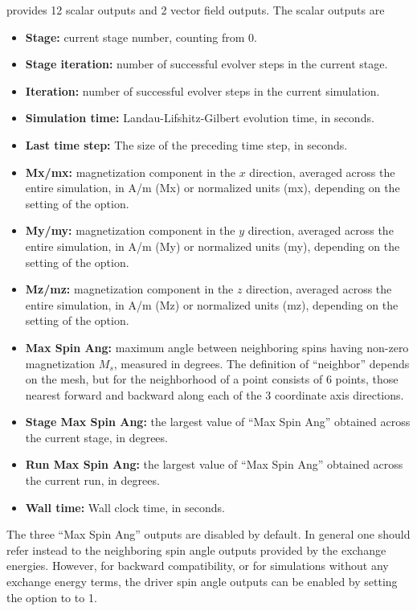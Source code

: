\begin{description}
 provides 12 scalar outputs and 2 vector field
outputs.  The scalar outputs are
\begin{itemize}
\item \textbf{Stage:} current stage number, counting from 0.
\item \textbf{Stage iteration:} number of successful evolver steps
in the current stage.
\item \textbf{Iteration:} number of successful evolver steps in the
current simulation.
\item \textbf{Simulation time:} Landau-Lifshitz-Gilbert evolution
time, in seconds.
\item \textbf{Last time step:} The size of the preceding time step, in
seconds.
\item \textbf{Mx/mx:} magnetization component in the $x$ direction,
averaged across the entire simulation, in A/m (Mx) or normalized units
(mx), depending on the setting of the 
option.
\item \textbf{My/my:} magnetization component in the $y$ direction,
averaged across the entire simulation, in A/m (My) or normalized units
(my), depending on the setting of the 
option.
\item \textbf{Mz/mz:} magnetization component in the $z$ direction,
averaged across the entire simulation, in A/m (Mz) or normalized units
(mz), depending on the setting of the 
option.
\item \textbf{Max Spin Ang:} maximum angle between neighboring spins
having non-zero magnetization $M_s$, measured in degrees.  The definition
of ``neighbor'' depends on the mesh, but for 
the neighborhood of a point consists of 6 points, those nearest
forward and backward along each of the 3 coordinate axis directions.
\item \textbf{Stage Max Spin Ang:} the largest value of ``Max Spin
Ang'' obtained across the current stage, in degrees.
\item \textbf{Run Max Spin Ang:} the largest value of ``Max Spin
Ang'' obtained across the current run, in degrees.
\item \textbf{Wall time:} Wall clock time, in seconds.
\end{itemize}
The three ``Max Spin Ang'' outputs are disabled by default.  In general
one should refer instead to the neighboring spin angle outputs provided
by the exchange energies.  However, for backward compatibility, or for
simulations without any exchange energy terms, the driver spin angle
outputs can be enabled by setting the
 option to to 1.


\end{description}
